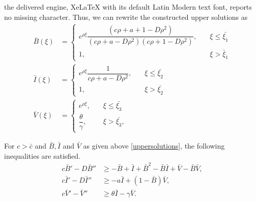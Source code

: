 \documentclass[10pt,a4paper]{amsart}
\begin{document}
the delivered engine, XeLaTeX with its default Latin Modern text font, reports no missing character.
Thus, we can rewrite the constructed upper solutions as \begin{align}\label{uppersolutions}
     \nonumber \bar{B}(\xi)& =
    \begin{cases}
     e^{\rho \xi} \dfrac{(c \rho+a+1-D \rho^2)}{(c \rho +a- D \rho^2)(c\rho +1- D\rho^2)},& \quad \xi \leq \bar{\xi_1}  \\ 
        1, & \quad \xi > \bar{\xi}_1
    \end{cases} \\\bar{I}(\xi) &=
    \begin{cases}
       e^{\rho \xi}\dfrac{1}{c \rho +a - D \rho^2}, & \quad \xi \leq \bar{\xi_2} \\ 
        1, & \quad \xi > \bar{\xi_2}
    \end{cases}\\ \nonumber\bar{V}(\xi)& =
    \begin{cases}
        e^{\rho \xi}, & \quad \xi \leq\bar{\xi_3} \\ 
         \dfrac{\theta}{\gamma},\, & \quad \xi >\bar{\xi_3},
    \end{cases}
\end{align}

\begin{lemma}
    For $c> \bar{c}$ and $\bar{B}, \bar{I}$ and $\bar{V}$ as given above \eqref{uppersolutions}, the following inequalities are satisfied. 
    \begin{align}\label{upper_condition_lemma}
      \nonumber  c \bar{B}'- D \bar{B}'' 
 &\geq- \bar{B}+\bar I +\bar{B}^2-\bar{B} \bar{I}+ \bar{V}-\bar{B} \bar{V}, \\  c \bar{I}'- D \bar{I}'' 
 &\geq -a\bar{I}+ (1-\bar{B})\bar{V}, \\ \nonumber c \bar{V}'-  \bar{V}'' 
 &\geq \theta \bar{I} - \gamma \bar{V}.
    \end{align}
\end{lemma}
\end{document}
